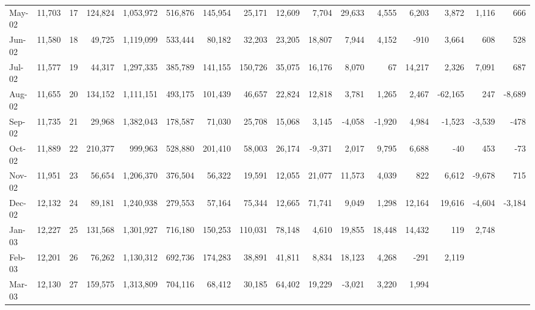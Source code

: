 \begin{exercises}
\begin{table}
\begin{center}
\begin{tabular}{lrcrrrrrrrrrrrrr}
    May-02 &     11,703 &         17 &    124,824 &  1,053,972 &    516,876 &    145,954 &     25,171 &     12,609 &      7,704 &     29,633 &      4,555 &      6,203 &      3,872 &      1,116 &        666 \\
    Jun-02 &     11,580 &         18 &     49,725 &  1,119,099 &    533,444 &     80,182 &     32,203 &     23,205 &     18,807 &      7,944 &      4,152 &       -910 &      3,664 &        608 &        528 \\
    Jul-02 &     11,577 &         19 &     44,317 &  1,297,335 &    385,789 &    141,155 &    150,726 &     35,075 &     16,176 &      8,070 &         67 &     14,217 &      2,326 &      7,091 &        687 \\
    Aug-02 &     11,655 &         20 &    134,152 &  1,111,151 &    493,175 &    101,439 &     46,657 &     22,824 &     12,818 &      3,781 &      1,265 &      2,467 &    -62,165 &        247 &     -8,689 \\
    Sep-02 &     11,735 &         21 &     29,968 &  1,382,043 &    178,587 &     71,030 &     25,708 &     15,068 &      3,145 &     -4,058 &     -1,920 &      4,984 &     -1,523 &     -3,539 &       -478 \\
    Oct-02 &     11,889 &         22 &    210,377 &    999,963 &    528,880 &    201,410 &     58,003 &     26,174 &     -9,371 &      2,017 &      9,795 &      6,688 &        -40 &        453 &        -73 \\
    Nov-02 &     11,951 &         23 &     56,654 &  1,206,370 &    376,504 &     56,322 &     19,591 &     12,055 &     21,077 &     11,573 &      4,039 &        822 &      6,612 &     -9,678 &        715 \\
    Dec-02 &     12,132 &         24 &     89,181 &  1,240,938 &    279,553 &     57,164 &     75,344 &     12,665 &     71,741 &      9,049 &      1,298 &     12,164 &     19,616 &     -4,604 &     -3,184 \\
    Jan-03 &     12,227 &         25 &    131,568 &  1,301,927 &    716,180 &    150,253 &    110,031 &     78,148 &      4,610 &     19,855 &     18,448 &     14,432 &        119 &      2,748 &            \\
    Feb-03 &     12,201 &         26 &     76,262 &  1,130,312 &    692,736 &    174,283 &     38,891 &     41,811 &      8,834 &     18,123 &      4,268 &       -291 &      2,119 &            &            \\
    Mar-03 &     12,130 &         27 &    159,575 &  1,313,809 &    704,116 &     68,412 &     30,185 &     64,402 &     19,229 &     -3,021 &      3,220 &      1,994 &            &            &            \\

\end{tabular}
\end{center}
\end{table}
\end{exercises}
